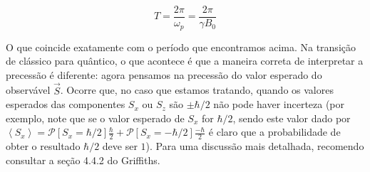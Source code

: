 \documentclass[a4paper, 12pt, notitlepage]{article}
\begin{document}
\begin{enumerate}
\begin{enumerate}[(a)]
\[ T = \frac{2\pi}{\omega_p} = \frac{2\pi}{\gamma B_0} \]

O que coincide exatamente com o período que encontramos acima. Na transição de clássico para quântico, o que acontece é que a maneira correta de interpretar a precessão é diferente: agora pensamos na precessão do valor esperado do observável $\vec{S}$. Ocorre que, no caso que estamos tratando, quando os valores esperados das componentes $S_x$ ou $S_z$ são $\pm \hbar / 2$ não pode haver incerteza (por exemplo, note que se o valor esperado de $S_x$ for $\hbar / 2$, sendo este valor dado por $\left\langle S_x \right\rangle = \mathcal{P}\left[S_x = \hbar/2\right] \frac{\hbar}{2} + \mathcal{P}\left[S_x = -\hbar/2\right]\frac{-\hbar}{2}$ é claro que a probabilidade de obter o resultado $\hbar/2$ deve ser $1$). Para uma discussão mais detalhada, recomendo consultar a seção 4.4.2 do Griffiths.

\end{enumerate}

\end{enumerate}
\end{document}
